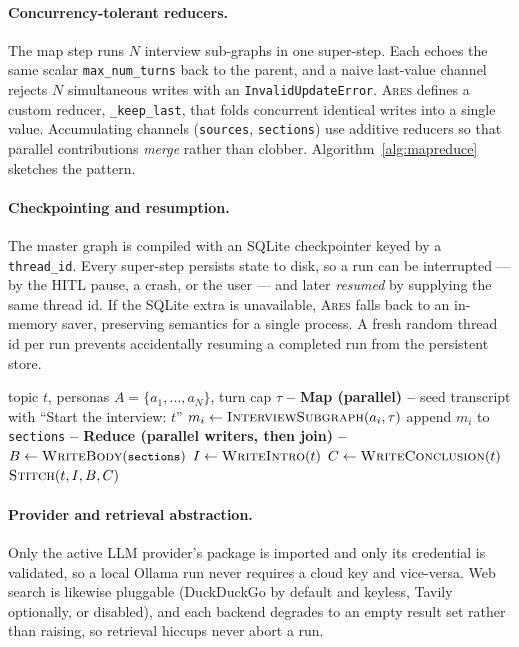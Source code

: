 \documentclass[10pt,twocolumn]{article}
\newcommand{\ares}{\textsc{Ares}}
\newcommand{\code}[1]{\texttt{\small #1}}
\begin{document}
\paragraph{Concurrency-tolerant reducers.} The map step runs $N$ interview
sub-graphs in one super-step. Each echoes the same scalar \code{max\_num\_turns}
back to the parent, and a naive last-value channel rejects $N$ simultaneous
writes with an \code{InvalidUpdateError}. \ares{} defines a custom reducer,
\code{\_keep\_last}, that folds concurrent identical writes into a single value.
Accumulating channels (\code{sources}, \code{sections}) use additive reducers so
that parallel contributions \emph{merge} rather than clobber. Algorithm~\ref{alg:mapreduce}
sketches the pattern.

\paragraph{Checkpointing and resumption.} The master graph is compiled with an
SQLite checkpointer keyed by a \code{thread\_id}. Every super-step persists state
to disk, so a run can be interrupted --- by the HITL pause, a crash, or the user
--- and later \emph{resumed} by supplying the same thread id. If the SQLite extra
is unavailable, \ares{} falls back to an in-memory saver, preserving semantics for
a single process. A fresh random thread id per run prevents accidentally resuming
a completed run from the persistent store.

\begin{algorithm}[t]
\caption{Map--reduce over analyst personas}
\label{alg:mapreduce}
\begin{algorithmic}[1]
\Require topic $t$, personas $A=\{a_1,\dots,a_N\}$, turn cap $\tau$
\Statex \textbf{-- Map (parallel) --}
  \State seed transcript with ``Start the interview: $t$''
  \State $m_i \gets \textproc{InterviewSubgraph}(a_i,\tau)$
  \State append $m_i$ to \code{sections} 
\EndFor
\Statex \textbf{-- Reduce (parallel writers, then join) --}
\State $B \gets \textproc{WriteBody}(\code{sections})$
\State $I \gets \textproc{WriteIntro}(t)$
\State $C \gets \textproc{WriteConclusion}(t)$
\State \Return $\textproc{Stitch}(t, I, B, C)$
\end{algorithmic}
\end{algorithm}

\paragraph{Provider and retrieval abstraction.} Only the active LLM provider's
package is imported and only its credential is validated, so a local Ollama run
never requires a cloud key and vice-versa. Web search is likewise pluggable
(DuckDuckGo by default and keyless, Tavily optionally, or disabled), and each
backend degrades to an empty result set rather than raising, so retrieval hiccups
never abort a run.
\end{document}
